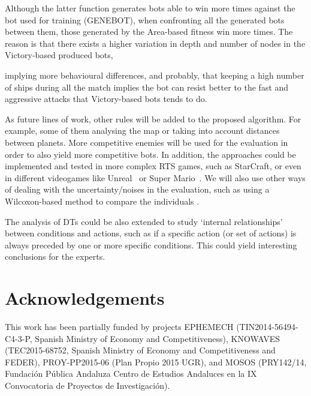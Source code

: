 \documentclass[preprint]{elsarticle}
\begin{document}
Although the latter function generates bots able to win more times against the bot used for training (GENEBOT), when confronting all the generated bots between them, those generated by the Area-based fitness win more times. The reason is that there exists a higher variation in depth and number of nodes in the Victory-based produced bots, 

implying more behavioural differences, and probably, that keeping a
high number of ships during all the match implies the bot can resist
better to the fast and aggressive attacks that Victory-based bots
tends to do. 

As future lines of work, other rules will be added to the proposed algorithm. For example, some of them analysing the map or taking into account distances between planets. More competitive enemies will be used for the evaluation in order to also yield more competitive bots. 
In addition, the approaches could be implemented and tested in more complex RTS games, such as StarCraft, or even in different videogames like Unreal\texttrademark~ or Super Mario\texttrademark~. We will also use other ways of dealing with the uncertainty/noises in the evaluation, such as using a Wilcoxon-based method to compare the individuals \cite{merelo2016statistical}. 

The analysis of DTs could be also extended to study `internal relationships' between conditions and actions, such as if a specific action (or set of actions) is always preceded by one or more specific conditions. This could yield interesting conclusions for the experts.



\section*{Acknowledgements}
This work has been partially funded by projects EPHEMECH (TIN2014-56494-C4-3-P, Spanish Ministry of Economy and Competitiveness), KNOWAVES (TEC2015-68752, Spanish Ministry of Economy and Competitiveness and FEDER), PROY-PP2015-06 (Plan Propio 2015 UGR), and MOSOS (PRY142/14, Fundaci\'on P\'ublica Andaluza Centro de Estudios Andaluces en la IX Convocatoria de Proyectos de Investigaci\'on).



\end{document}

